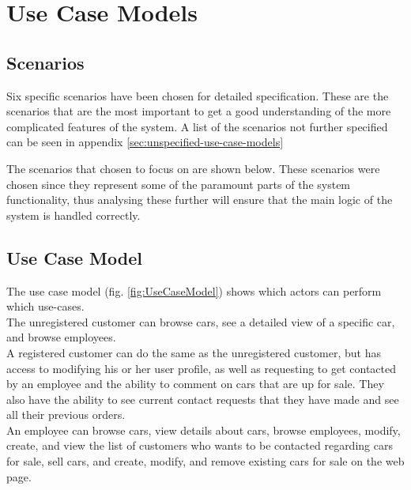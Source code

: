 \section{Use Case Models}

\subsection{Scenarios}
Six specific scenarios have been chosen for detailed specification. These are the scenarios that are the most important to get a good understanding of the more complicated features of the system. A list of the scenarios not further specified can be seen in appendix \ref{sec:unspecified-use-case-models}

The scenarios that chosen to focus on are shown below. These scenarios were chosen since they represent some of the paramount parts of the system functionality, thus analysing these further will ensure that the main logic of the system is handled correctly.













\subsection{Use Case Model}
The use case model (fig. \ref{fig:UseCaseModel}) shows which actors can perform which use-cases.\\

The unregistered customer can browse cars, see a detailed view of a specific car, and browse employees.\\
A registered customer can do the same as the unregistered customer, but has access to modifying his or her user profile, as well as requesting to get contacted by an employee and the ability to comment on cars that are up for sale.
They also have the ability to see current contact requests that they have made and see all their previous orders.\\

An employee can browse cars, view details about cars, browse employees, modify, create, and view the list of customers who wants to be contacted regarding cars for sale, sell cars, and create, modify, and remove existing cars for sale on the web page.\\

